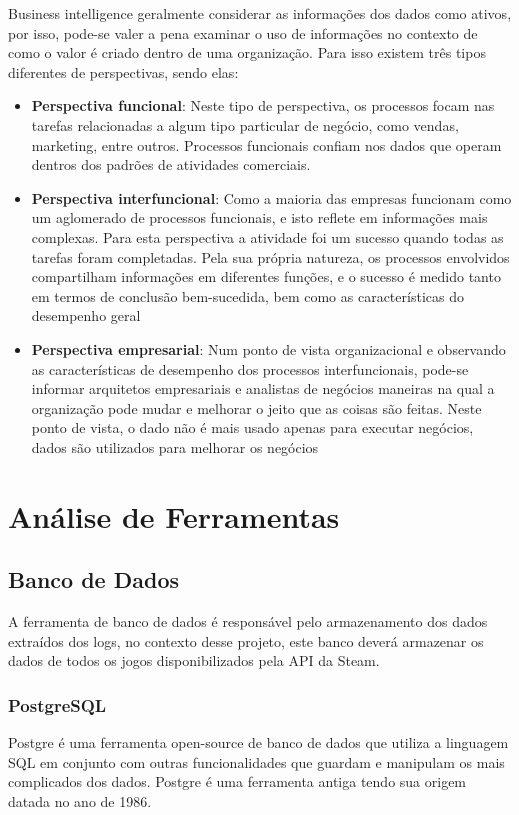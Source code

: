 Business intelligence geralmente considerar as informações dos dados como ativos, por isso, pode-se valer a pena examinar o uso de informações no contexto de como o valor é criado dentro de uma organização. Para isso existem três tipos diferentes de perspectivas, sendo elas:
\begin{itemize}
		\item \textbf{Perspectiva funcional}: Neste tipo de perspectiva, os processos focam nas tarefas relacionadas a algum tipo particular de negócio, como vendas, marketing, entre outros. Processos funcionais confiam nos dados que operam dentros dos padrões de atividades comerciais.
		\item \textbf{Perspectiva interfuncional}: Como a maioria das empresas funcionam como um aglomerado de processos funcionais, e isto reflete em informações mais complexas. Para esta perspectiva a atividade foi um sucesso quando todas as tarefas foram completadas. Pela sua própria natureza, os processos envolvidos compartilham informações em diferentes funções, e o sucesso é medido tanto em termos de conclusão bem-sucedida, bem como as características do desempenho geral
		\item \textbf{Perspectiva empresarial}: Num ponto de vista organizacional e observando as características de desempenho dos processos interfuncionais, pode-se informar arquitetos empresariais e analistas de negócios maneiras na qual a organização pode mudar e melhorar o jeito que as coisas são feitas. Neste ponto de vista, o dado não é mais usado apenas para executar negócios, dados são utilizados para melhorar os negócios
\end{itemize}
\section{Análise de Ferramentas}
\subsection{Banco de Dados}
A ferramenta de banco de dados é responsável pelo armazenamento dos dados extraídos dos logs, no contexto desse projeto, este banco deverá armazenar os dados de todos os jogos disponibilizados pela API da Steam.
\subsubsection*{PostgreSQL}
Postgre é uma ferramenta open-source de banco de dados que utiliza a linguagem SQL em conjunto com outras funcionalidades que guardam e manipulam os mais complicados dos dados. Postgre é uma ferramenta antiga tendo sua origem datada no ano de 1986\cite{postgresql}.

